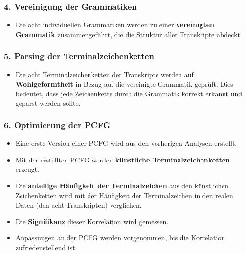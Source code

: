\documentclass[
]{article}
\begin{document}
\subsubsection{\texorpdfstring{4. \textbf{Vereinigung der
Grammatiken}}{4. Vereinigung der Grammatiken}}\label{vereinigung-der-grammatiken}

\begin{itemize}
\item
  Die acht individuellen Grammatiken werden zu einer \textbf{vereinigten
  Grammatik} zusammengeführt, die die Struktur aller Transkripte
  abdeckt.
\end{itemize}

\subsubsection{\texorpdfstring{5. \textbf{Parsing der
Terminalzeichenketten}}{5. Parsing der Terminalzeichenketten}}\label{parsing-der-terminalzeichenketten}

\begin{itemize}
\item
  Die acht Terminalzeichenketten der Transkripte werden auf
  \textbf{Wohlgeformtheit} in Bezug auf die vereinigte Grammatik
  geprüft. Dies bedeutet, dass jede Zeichenkette durch die Grammatik
  korrekt erkannt und geparst werden sollte.
\end{itemize}

\subsubsection{\texorpdfstring{6. \textbf{Optimierung der
PCFG}}{6. Optimierung der PCFG}}\label{optimierung-der-pcfg}

\begin{itemize}
\item
  Eine erste Version einer PCFG wird aus den vorherigen Analysen
  erstellt.
\item
  Mit der erstellten PCFG werden \textbf{künstliche
  Terminalzeichenketten} erzeugt.
\item
  Die \textbf{anteilige Häufigkeit der Terminalzeichen} aus den
  künstlichen Zeichenketten wird mit der Häufigkeit der Terminalzeichen
  in den realen Daten (den acht Transkripten) verglichen.
\item
  Die \textbf{Signifikanz} dieser Korrelation wird gemessen.
\item
  Anpassungen an der PCFG werden vorgenommen, bis die Korrelation
  zufriedenstellend ist.
\end{itemize}
\end{document}
